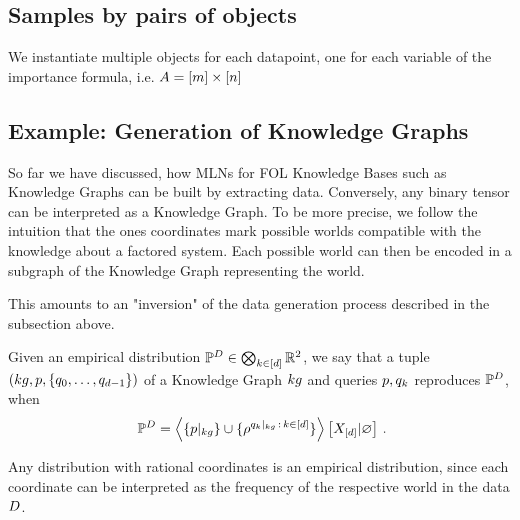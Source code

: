 \subsection{Samples by pairs of objects}

We instantiate multiple objects for each datapoint, one for each variable of the importance formula, i.e. $A=[m]\times[n]$



\subsection{Example: Generation of Knowledge Graphs} %

So far we have discussed, how MLNs for FOL Knowledge Bases such as Knowledge Graphs can be built by extracting data.
Conversely, any binary tensor can be interpreted as a Knowledge Graph.
To be more precise, we follow the intuition that the ones coordinates mark possible worlds compatible with the knowledge about a factored system.
Each possible world can then be encoded in a subgraph of the Knowledge Graph representing the world.

%
This amounts to an "inversion" of the data generation process described in the subsection above.

%


\begin{definition}
	Given an empirical distribution $\mathbb{P}^{D}\in\bigotimes_{k\in[d]}\mathbb{R}^2$, we say that a tuple $(kg,p,\{q_{0},\ldots,q_{d-1}\})$ of a Knowledge Graph $kg$ and queries $p,q_{k}$ reproduces $\mathbb{P}^{D}$, when
		\[ \empdistribution = \normationof{\{\kggroundingof{\impformula}\}\cup\{\rencodingof{\kggroundingof{\extformulaof{\atomenumerator}}\, : \, \atomenumeratorin}\}}{\shortcatvariables} \, .  \]
\end{definition}

%
Any distribution with rational coordinates is an empirical distribution, since each coordinate can be interpreted as the frequency of the respective world in the data $D$.


